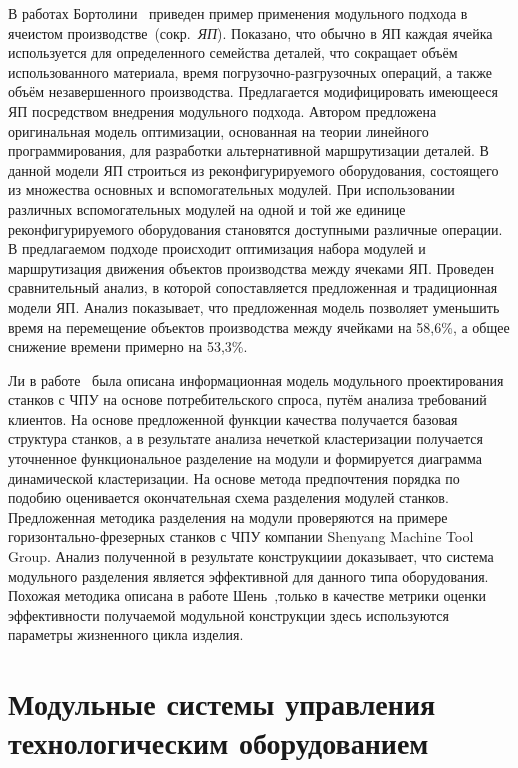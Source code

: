 В работах Бортолини~\cite{bortolini2019reconfigurability, bortolini2019dynamic} приведен пример применения модульного подхода в ячеистом производстве~(сокр.~\textit{ЯП}). Показано, что обычно в ЯП каждая ячейка используется для определенного семейства деталей, что сокращает объём использованного материала, время погрузочно-разгрузочных операций, а также объём незавершенного производства. Предлагается модифицировать имеющееся ЯП посредством внедрения модульного подхода. Автором предложена оригинальная модель оптимизации, основанная на теории линейного программирования, для разработки альтернативной маршрутизации деталей. В данной модели ЯП строиться из реконфигурируемого оборудования, состоящего из множества основных и вспомогательных модулей. При использовании различных вспомогательных модулей на одной и той же единице реконфигурируемого оборудования становятся доступными различные операции. В предлагаемом подходе происходит оптимизация набора модулей и маршрутизация движения объектов производства между ячеками ЯП. Проведен сравнительный анализ, в которой сопоставляется предложенная и традиционная модели ЯП. Анализ показывает, что предложенная модель позволяет уменьшить время на перемещение объектов производства между ячейками на 58,6\%, а общее снижение времени примерно на 53,3\%.

Ли в работе~\cite{li2020modular} была описана информационная модель модульного проектирования станков с ЧПУ на основе  потребительского спроса, путём анализа требований клиентов. На основе предложенной функции качества получается базовая структура станков, а в результате анализа нечеткой кластеризации получается уточненное функциональное разделение на модули и формируется диаграмма динамической кластеризации. На основе метода предпочтения порядка по подобию оценивается окончательная схема разделения модулей станков. Предложенная методика разделения на модули проверяются на примере горизонтально-фрезерных станков с ЧПУ компании Shenyang Machine Tool Group. Анализ полученной в результате конструкциии доказывает, что система модульного разделения является эффективной для данного типа оборудования. Похожая методика описана в работе Шень~\cite{sheng2017lifecycle},только в качестве метрики оценки эффективности получаемой модульной конструкции здесь используются параметры жизненного цикла изделия.  

\section{Модульные системы управления технологическим оборудованием}\label{sec:ch1/sec2}

